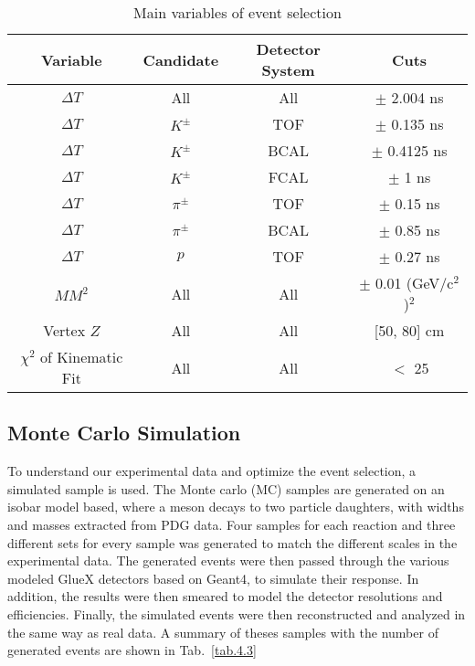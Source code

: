 \begin{table}[H]
    \centering
    \caption{Main variables of event selection}
    \label{tab.4.2}
    \begin{tabular}{|c|c|c|c|}
        \hline
        Variable & Candidate & Detector System & Cuts \\
        \hline
        $\Delta T$ & All & All & $\pm$ 2.004 ns \\
        \hline
        $\Delta T$ & $K^{\pm}$ & TOF & $\pm$ 0.135 ns \\
        \hline
        $\Delta T$ & $K^{\pm}$ & BCAL & $\pm$ 0.4125 ns \\
        \hline
        $\Delta T$ & $K^{\pm}$ & FCAL & $\pm$ 1 ns \\
        \hline
        $\Delta T$ & $\pi^{\pm}$ & TOF & $\pm$ 0.15 ns \\
        \hline
        $\Delta T$ & $\pi^{\pm}$ & BCAL & $\pm$ 0.85 ns \\
        \hline
        $\Delta T$ & $p$ & TOF & $\pm$ 0.27 ns \\
        \hline
        $MM^2$ & All & All & $\pm$ 0.01 (GeV/c$^2$ )$^2$ \\
        \hline
        Vertex $Z$ & All & All & [50, 80] cm\\
        \hline
        $\chi^2$ of Kinematic Fit & All & All & $<$ 25\\
        \hline
    \end{tabular}
\end{table}

\subsection{Monte Carlo Simulation}
\label{p.4.3}

To understand our experimental data and optimize the event selection, a simulated sample is used. The Monte carlo (MC) samples are generated on an isobar model based, where a meson decays to two particle daughters, with widths and masses extracted from PDG data. Four samples for each reaction and three different sets for every sample was generated to match the different scales in the experimental data. The generated events were then passed through the various modeled GlueX detectors based on Geant4, to simulate their response. In addition, the results were then smeared to model the detector resolutions and efficiencies. Finally, the simulated events were then reconstructed and analyzed in the same way as real data. A summary of theses samples with the number of generated events are shown in Tab.~\ref{tab.4.3}   

